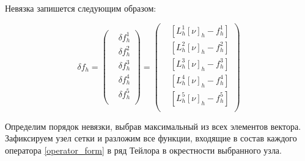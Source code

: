 {{		Невязка запишется следующим образом:
		
		\begin{equation}\label{discrepancy}
			\delta f_h =
			\left(\begin{split}
				& \delta f^1_h \\
				& \delta f^2_h \\
				& \delta f^3_h \\
				& \delta f^4_h \\
				& \delta f^5_h \\
				\end{split}
			\right) 
			=
			\left(\begin{split}
				& {[L^1_h[\nu]_h - f^1_h]} \\
				& {[L^2_h[\nu]_h - f^2_h]} \\
				& {[L^3_h[\nu]_h - f^3_h]} \\
				& {[L^4_h[\nu]_h - f^4_h]} \\
				& {[L^5_h[\nu]_h - f^5_h]} \\
				\end{split}
			\right) 
		\end{equation}
		
		Определим порядок невязки, выбрав максимальный из всех элементов вектора. Зафиксируем узел сетки и разложим все функции, входящие в состав каждого оператора \eqref{operator_form} в ряд Тейлора в окрестности выбранного узла. 
		
		
			
}}
